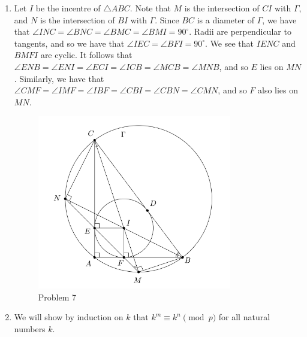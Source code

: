 \documentclass[12pt]{article}
\begin{document}
\begin{enumerate}
\item %
Let $I$ be the incentre of $\triangle ABC$. Note that $M$ is the intersection of
$CI$ with $\Gamma$, and $N$ is the intersection of $BI$ with $\Gamma$. Since
$BC$ is a diameter of $\Gamma$, we have that $\angle INC = \angle BNC = \angle
BMC = \angle BMI = 90^\circ$. Radii are perpendicular to tangents, and so we
have that $\angle IEC = \angle BFI = 90^\circ$. We see that $IENC$ and $BMFI$
are cyclic. It follows that $\angle ENB = \angle ENI = \angle ECI = \angle ICB =
\angle MCB = \angle MNB$, and so $E$ lies on $MN$. Similarly, we have that
$\angle CMF = \angle IMF = \angle IBF = \angle CBI = \angle CBN = \angle CMN$,
and so $F$ also lies on $MN$.

\begin{figure}[!ht]
\centering
\includegraphics[width=0.8\textwidth]{march_q7.png}
\caption{Problem 7}
\end{figure}

\item %
%
We will show by induction on $k$ that $k^m \equiv k^n \pmod{p}$ for all natural
numbers $k$.


\end{enumerate}
\end{document}

